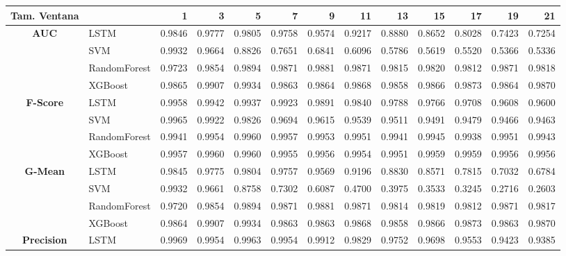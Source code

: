 \begin{table}[h]
	\centering
	\begin{adjustbox}{max width=15cm}
		\begin{tabular}{|c|l|r|r|r|r|r|r|r|r|r|r|r|}
			\hline
			\textbf{Tam. Ventana}&         &      1  &      3  &      5  &      7  &      9  &      11 &      13 &      15 &      17 &      19 &      21 \\
			\hline
			\textbf{AUC} & LSTM &  0.9846 &  0.9777 &  0.9805 &  0.9758 &  0.9574 &  0.9217 &  0.8880 &  0.8652 &  0.8028 &  0.7423 &  0.7254 \\
			& SVM &  0.9932 &  0.9664 &  0.8826 &  0.7651 &  0.6841 &  0.6096 &  0.5786 &  0.5619 &  0.5520 &  0.5366 &  0.5336 \\
			& RandomForest &  0.9723 &  0.9854 &  0.9894 &  0.9871 &  0.9881 &  0.9871 &  0.9815 &  0.9820 &  0.9812 &  0.9871 &  0.9818 \\
			& XGBoost &  0.9865 &  0.9907 &  0.9934 &  0.9863 &  0.9864 &  0.9868 &  0.9858 &  0.9866 &  0.9873 &  0.9864 &  0.9870 \\
			\hline
			\textbf{F-Score} & LSTM &  0.9958 &  0.9942 &  0.9937 &  0.9923 &  0.9891 &  0.9840 &  0.9788 &  0.9766 &  0.9708 &  0.9608 &  0.9600 \\
			& SVM &  0.9965 &  0.9922 &  0.9826 &  0.9694 &  0.9615 &  0.9539 &  0.9511 &  0.9491 &  0.9479 &  0.9466 &  0.9463 \\
			& RandomForest &  0.9941 &  0.9954 &  0.9960 &  0.9957 &  0.9953 &  0.9951 &  0.9941 &  0.9945 &  0.9938 &  0.9951 &  0.9943 \\
			& XGBoost &  0.9957 &  0.9960 &  0.9960 &  0.9955 &  0.9956 &  0.9954 &  0.9951 &  0.9959 &  0.9959 &  0.9956 &  0.9956 \\
			\hline
			\textbf{G-Mean} & LSTM &  0.9845 &  0.9775 &  0.9804 &  0.9757 &  0.9569 &  0.9196 &  0.8830 &  0.8571 &  0.7815 &  0.7032 &  0.6784 \\
			& SVM &  0.9932 &  0.9661 &  0.8758 &  0.7302 &  0.6087 &  0.4700 &  0.3975 &  0.3533 &  0.3245 &  0.2716 &  0.2603 \\
			& RandomForest &  0.9720 &  0.9854 &  0.9894 &  0.9871 &  0.9881 &  0.9871 &  0.9814 &  0.9819 &  0.9812 &  0.9871 &  0.9817 \\
			& XGBoost &  0.9864 &  0.9907 &  0.9934 &  0.9863 &  0.9863 &  0.9868 &  0.9858 &  0.9866 &  0.9873 &  0.9863 &  0.9870 \\
			\hline
			\textbf{Precision} & LSTM &  0.9969 &  0.9954 &  0.9963 &  0.9954 &  0.9912 &  0.9829 &  0.9752 &  0.9698 &  0.9553 &  0.9423 &  0.9385 \\

\end{tabular}
\end{adjustbox}
\end{table}
